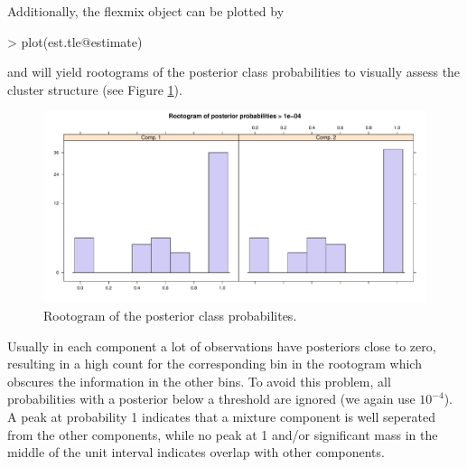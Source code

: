 \documentclass[article,shortnames,nojss]{jss}
\begin{document}
Additionally, the flexmix object can be plotted by
\begin{Schunk}
\begin{Sinput}
> plot(est.tle@estimate)
\end{Sinput}
\end{Schunk}
and will yield rootograms of the posterior class probabilities
to visually assess the cluster structure (see Figure \ref{fig:rootogram}).
\begin{figure}[htbp]
  \centering
\includegraphics{tlemix-intro-012}
  \caption{Rootogram of the posterior class probabilites.}
  \label{fig:rootogram}
\end{figure}

Usually in each component a lot of observations have posteriors close
to zero, resulting in a high count for the corresponding bin in the
rootogram which obscures the information in the other bins. To avoid
this problem, all probabilities with a posterior below a threshold are
ignored (we again use $10^{-4}$).  A peak at probability 1 indicates that a
mixture component is well seperated from the other components, while
no peak at 1 and/or significant mass in the middle of the unit
interval indicates overlap with other components.

\pagebreak[4]


\end{document}

